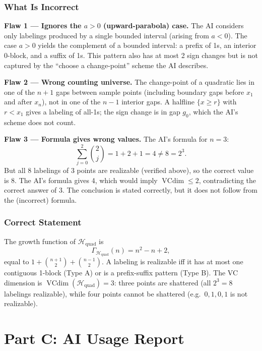 \documentclass{article}
\begin{document}
\subsubsection{What Is Incorrect}
 
\textbf{Flaw 1 --- Ignores the $a>0$ (upward-parabola) case.}
The AI considers only labelings produced by a single bounded interval
(arising from $a<0$). The case $a>0$ yields the complement of a bounded
interval: a prefix of 1s, an interior 0-block, and a suffix of 1s.
This pattern also has at most 2 sign changes but is not captured by the
``choose a change-point'' scheme the AI describes.
 
\textbf{Flaw 2 --- Wrong counting universe.}
The change-point of a quadratic lies in one of the $n+1$ gaps between
sample points (including boundary gaps before $x_1$ and after $x_n$),
not in one of the $n-1$ interior gaps. A halfline $\{x\ge r\}$ with
$r<x_1$ gives a labeling of all-1s; the sign change is in gap $g_0$,
which the AI's scheme does not count.
 
\textbf{Flaw 3 --- Formula gives wrong values.}
The AI's formula for $n=3$:
\[
  \sum_{j=0}^{2}\binom{2}{j} = 1+2+1 = 4 \ne 8 = 2^3.
\]
But all 8 labelings of 3 points are realizable (verified above), so
the correct value is $8$. The AI's formula gives 4, which would imply
$\operatorname{VCdim}\le2$, contradicting the correct answer of 3.
The conclusion is stated correctly, but it does not follow from the
(incorrect) formula.
 
\subsubsection{Correct Statement}
 
\begin{theorem}
The growth function of $\mathcal{H}_{\mathrm{quad}}$ is
\[
  \Gamma_{\mathcal{H}_{\mathrm{quad}}}(n) = n^2-n+2,
\]
equal to $1+\binom{n+1}{2}+\binom{n-1}{2}$.
A labeling is realizable iff it has at most one contiguous 1-block
(Type A) or is a prefix-suffix pattern (Type B).
The VC dimension is $\operatorname{VCdim}(\mathcal{H}_{\mathrm{quad}})=3$:
three points are shattered (all $2^3=8$ labelings realizable), while four
points cannot be shattered (e.g.\ $0,1,0,1$ is not realizable).
\end{theorem}
 
\section{Part C: AI Usage Report}
 
\end{document}
